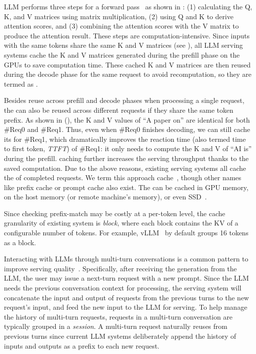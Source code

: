 LLM performs three steps for a forward pass~\cite{DBLP:conf/nips/VaswaniSPUJGKP17} as shown in {}:
(1) calculating the Q, K, and V matrices using matrix multiplication,
(2) using Q and K to derive attention scores,
and (3) combining the attention scores with the V matrix to produce the attention result.
These steps are computation-intensive.
Since inputs with the same tokens share the same K and V matrices (see ),
all LLM serving systems cache the K and V matrices generated during the prefill phase
on the GPUs to save computation time.
These cached K and V matrices are then reused
during the decode phase for the same request to avoid recomputation, so they are termed as {\kvcache}.


Besides {\kvcache} reuse across prefill and decode phases
when processing a single request,
the {\kvcache} can also be reused across different requests
if they share the same token prefix.
As shown in {} (),
the K and V values of ``A paper on''
are identical for both \#Req0 and \#Req1.
Thus, even when \#Req0 finishes decoding,
we can still cache its {\kvcache} for \#Req1,
which dramatically improves the reaction time (also termed time to first token, \emph{TTFT}) of \#Req1:
it only needs to compute the K and V of ``AI is'' during the prefill.
{\kvcache} caching further increases the serving throughput thanks to the saved computation.
Due to the above reasons, existing serving systems all cache the {\kvcache} of completed requests.
We term this approach {\kvcache} cache~\cite{vllm,cachedattention,promptcache,sglang,DBLP:journals/corr/abs-2404-12457,DBLP:conf/sigcomm/LiuLCRHZDY0AMHH24,DBLP:journals/corr/abs-2403-14401},
though other names like prefix cache or prompt cache also exist.
The {\kvcache} can be cached in GPU memory,
on the host memory (or remote machine's memory),
or even SSD~\cite{vllm,cachedattention,DBLP:journals/corr/abs-2403-14401}.

Since checking prefix-match may be costly at a per-token level,
the cache granularity of
existing {\kvcache} system is \emph{block},
where each block contains the KV of a configurable number of tokens.
For example, vLLM~\cite{vllm} by default groups 16 tokens as a block.


Interacting with LLMs through multi-turn conversations is a common pattern
to improve serving quality~\cite{wu2024autogen,wang2023mint}.
Specifically, after receiving the generation from the LLM,
the user may issue a next-turn request with a new prompt. 
Since the LLM needs the previous conversation context for processing, 
the serving system will concatenate the input and output of requests from the previous turns
to the new request's input, and feed the new input to the LLM for serving. 
To help manage the history of multi-turn requests, 
requests in a multi-turn conversation are typically grouped in a \emph{session}.
A multi-turn request naturally reuses {\kvcache} from previous turns 
since current LLM systems deliberately append the history of inputs and outputs 
as a prefix to each new request.